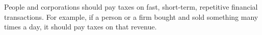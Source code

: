 People and corporations should pay taxes on fast, short-term, repetitive financial transactions. For example, if a person or a firm bought and sold something many times a day, it should pay taxes on that revenue.

